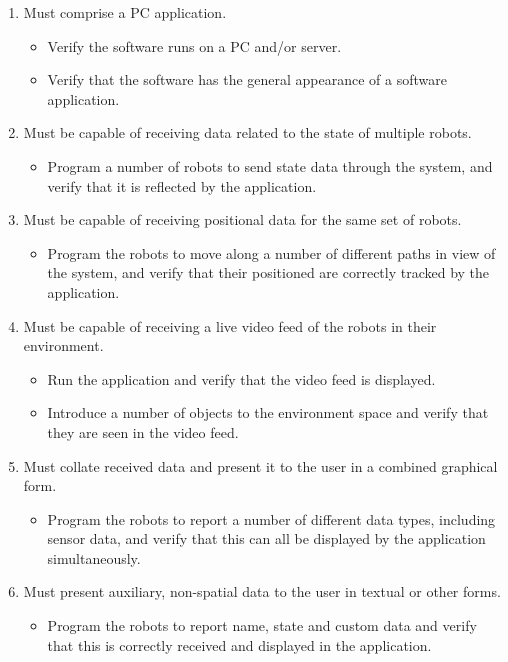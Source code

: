 \begin{enumerate}[label=C\arabic*.]
 \item Must comprise a PC application.
 \begin{itemize}
  \item Verify the software runs on a PC and/or server.
  \item Verify that the software has the general appearance of a software application.
 \end{itemize}
 
 \item Must be capable of receiving data related to the state of multiple robots.
 \begin{itemize}
  \item Program a number of robots to send state data through the system, and verify that it is reflected by the application.
 \end{itemize}
 
 \item Must be capable of receiving positional data for the same set of robots.
 \begin{itemize}
  \item Program the robots to move along a number of different paths in view of the system, and verify that their positioned are correctly tracked by the application.
 \end{itemize}
 
 \item Must be capable of receiving a live video feed of the robots in their environment.
 \begin{itemize}
  \item Run the application and verify that the video feed is displayed.
  \item Introduce a number of objects to the environment space and verify that they are seen in the video feed.
 \end{itemize}
 
 \item Must collate received data and present it to the user in a combined graphical form.
 \begin{itemize}
  \item Program the robots to report a number of different data types, including sensor data, and verify that this can all be displayed by the application simultaneously.
 \end{itemize}
 
 \item Must present auxiliary, non-spatial data to the user in textual or other forms.
 \begin{itemize}
  \item Program the robots to report name, state and custom data and verify that this is correctly received and displayed in the application.
 \end{itemize}
 

\end{enumerate}
